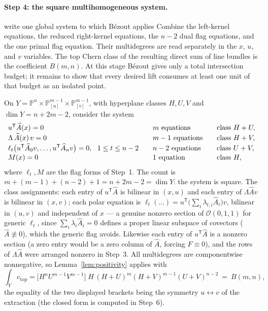 \documentclass[acmsmall,screen,nonacm]{acmart}
\theoremstyle{definition}
\theoremstyle{remark}
\newcommand{\PP}{\mathbb{P}}
\newcommand{\OO}{\mathcal{O}}
\begin{document}
\paragraph{Step 4: the square multihomogeneous system.}
\begin{roadmapbox}{write one global system to which B\'ezout applies}
Combine the left-kernel equations, the reduced right-kernel equations, the
$n-2$ dual flag equations, and the one primal flag equation.  Their
multidegrees are read separately in the $x$, $u$, and $v$ variables.  The top
Chern class of the resulting direct sum of line bundles is the coefficient
$B(m,n)$.  At this stage B\'ezout gives only a total intersection budget; it
remains to show that every desired lift consumes at least one unit of that
budget as an isolated point.
\end{roadmapbox}
On $Y=\PP^n\times\PP^{m-1}_{[u]}\times\PP^{m-1}_{[v]}$, with
hyperplane classes $H,U,V$ and $\dim Y=n+2m-2$, consider the system
\begin{equation}\label{eq:system}
\begin{array}{l@{\qquad}l@{\qquad}l}
  u^{\mathsf T}\widehat A(x)=0 & m\ \text{equations} & \text{class }H+U,\\[1pt]
  \Lambda\,\widehat A(x)\,v=0 & m-1\ \text{equations} & \text{class }H+V,\\[1pt]
  \ell_t\big(u^{\mathsf T}\widehat A_0v,\dots,
        u^{\mathsf T}\widehat A_nv\big)=0,\ \ 1\le t\le n-2
        & n-2\ \text{equations} & \text{class }U+V,\\[1pt]
  M(x)=0 & 1\ \text{equation} & \text{class }H,
\end{array}
\end{equation}
where $\ell_t,M$ are the flag forms of Step~1.  The count is
$m+(m-1)+(n-2)+1=n+2m-2=\dim Y$: the system is square.  The class
assignments: each entry of $u^{\mathsf T}\widehat A$ is bilinear in
$(x,u)$ and each entry of $\Lambda\widehat Av$ is bilinear in $(x,v)$;
each polar equation is
$\ell_t(\dots)=u^{\mathsf T}\big(\sum_i\lambda_{t,i}\widehat A_i\big)v$,
bilinear in $(u,v)$ and independent of $x$ --- a genuine nonzero
section of $\OO(0,1,1)$ for generic $\ell_t$, since
$\sum_i\lambda_i\widehat A_i=0$ defines a proper linear subspace of
covectors ($\widehat A\not\equiv0$), which the generic flag avoids.
Likewise each entry of $u^{\mathsf T}\widehat A$ is a nonzero section
(a zero entry would be a zero column of $\widehat A$, forcing
$F\equiv0$), and the rows of $\Lambda\widehat A$ were arranged nonzero
in Step~3.  All multidegrees are componentwise nonnegative, so
Lemma~\ref{lem:positivity} applies with
\[
  \int_Y c_{\mathrm{top}}
  =\big[H^nU^{m-1}V^{m-1}\big]\;
  H\,(H+U)^m(H+V)^{m-1}(U+V)^{n-2}
  \ =\ B(m,n),
\]
the equality of the two displayed brackets being the symmetry
$u\leftrightarrow v$ of the extraction (the closed form is computed in
Step~6).
\end{document}
